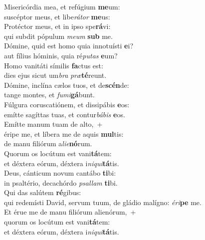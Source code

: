 \evenverse Misericórdia mea, et refúgium \textbf{me}um:~\*\\
\evenverse suscéptor meus, et libe\textit{rá}\textit{tor} \textbf{me}us:\\
\oddverse Protéctor meus, et in ipso spe\textbf{rá}vi:~\*\\
\oddverse qui subdit pópulum \textit{me}\textit{um} \textbf{sub} me.\\
\evenverse Dómine, quid est homo quia innotuísti \textbf{e}i?~\*\\
\evenverse aut fílius hóminis, quia ré\textit{pu}\textit{tas} \textbf{e}um?\\
\oddverse Homo vanitáti símilis \textbf{fa}ctus est:~\*\\
\oddverse dies ejus sicut um\textit{bra} \textit{præ}\textbf{té}reunt.\\
\evenverse Dómine, inclína cælos tuos, et de\textbf{scén}de:~\*\\
\evenverse tange montes, et \textit{fu}\textit{mi}\textbf{gá}bunt.\\
\oddverse Fúlgura coruscatiónem, et dissipábis \textbf{e}os:~\*\\
\oddverse emítte sagíttas tuas, et contur\textit{bá}\textit{bis} \textbf{e}os.\\
\evenverse Emítte manum tuam de alto,~+\\
\evenverse  éripe me, et líbera me de aquis \textbf{mul}tis:~\*\\
\evenverse de manu filiórum a\textit{li}\textit{e}\textbf{nó}rum.\\
\oddverse Quorum os locútum est vani\textbf{tá}tem:~\*\\
\oddverse et déxtera eórum, déxtera i\textit{ni}\textit{qui}\textbf{tá}tis.\\
\evenverse Deus, cánticum novum cantábo \textbf{ti}bi:~\*\\
\evenverse in psaltério, decachórdo \textit{psal}\textit{lam} \textbf{ti}bi.\\
\oddverse Qui das salútem \textbf{ré}gibus:~\*\\
\oddverse qui redemísti David, servum tuum, de gládio malígno: \textit{é}\textit{ri}\textbf{pe} me.\\
\evenverse Et érue me de manu filiórum alienórum,~+\\
\evenverse  quorum os locútum est vani\textbf{tá}tem:~\*\\
\evenverse et déxtera eórum, déxtera i\textit{ni}\textit{qui}\textbf{tá}tis.\\

